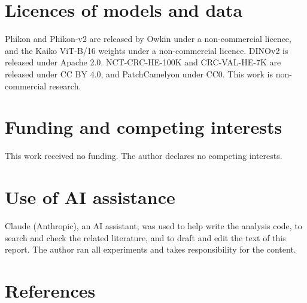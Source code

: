 \documentclass[11pt,a4paper]{article}
\begin{document}
\section*{Licences of models and data}

Phikon and Phikon-v2 are released by Owkin under a non-commercial licence, and the Kaiko ViT-B/16 weights under a non-commercial licence. DINOv2 is released under Apache 2.0. NCT-CRC-HE-100K and CRC-VAL-HE-7K are released under CC BY 4.0, and PatchCamelyon under CC0. This work is non-commercial research.

\section*{Funding and competing interests}

This work received no funding. The author declares no competing interests.

\section*{Use of AI assistance}

Claude (Anthropic), an AI assistant, was used to help write the analysis code, to search and check the related literature, and to draft and edit the text of this report. The author ran all experiments and takes responsibility for the content.

\section*{References}
\end{document}

